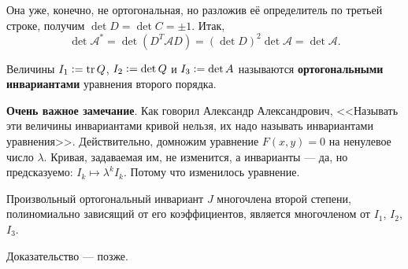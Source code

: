 Она уже, конечно, не ортогональная, но разложив её определитель по третьей строке, получим $\det D = \det C = \pm 1$. Итак,
$$
\det \mathcal{A}^\ast = \det(D^T\mathcal{A}D) = (\det D)^2 \det \mathcal{A} = \det \mathcal{A}.
$$

\begin{definition}
    Величины $I_1 \vcentcolon = \mathrm{tr}\, Q$, $I_2 \vcentcolon = \det Q$ и $I_3 \vcentcolon = \det A$ называются \textbf{ортогональными инвариантами} уравнения второго порядка.
\end{definition}

\begin{remark}
    \textbf{Очень важное замечание}. Как говорил Александр Александрович, <<Называть эти величины инвариантами кривой нельзя, их надо называть инвариантами уравнения>>. Действительно, домножим уравнение $F(x, y) = 0$ на ненулевое число $\lambda$. Кривая, задаваемая им, не изменится, а инварианты --- да, но предсказуемо: $I_k \mapsto \lambda^k I_k$. Потому что изменилось уравнение.
\end{remark}

\begin{theorem}
    Произвольный ортогональный инвариант $J$ многочлена второй степени, полиномиально зависящий от его коэффициентов, является многочленом от $I_1$, $I_2$, $I_3$.
\end{theorem}

Доказательство --- позже.

